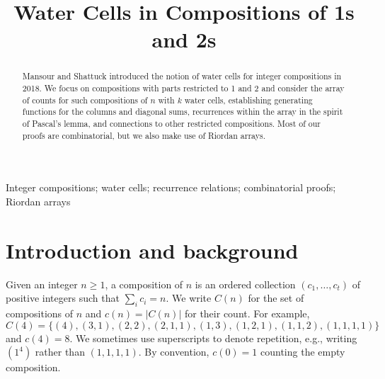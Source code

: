 \documentclass[]{interact}
\makeatletter
\newcommand{\monthyear}[1]{%
  \def\@monthyear{\uppercase{#1}}}
\newcommand{\volnumber}[1]{%
  \def\@volnumber{\uppercase{#1}}}
\theoremstyle{plain}
\numberwithin{equation}{section} %
\numberwithin{table}{section} %
\numberwithin{figure}{section}
\makeatother
\begin{document}
\monthyear{Month Year}
\volnumber{Volume, Number}
\setcounter{page}{1}

\title{Water Cells in Compositions of 1s and 2s}

\author{
}

\maketitle

\begin{abstract}
Mansour and Shattuck introduced the notion of water cells for integer compositions in 2018.  We focus on compositions with parts restricted to 1 and 2 and consider the array of counts for such compositions of $n$ with $k$ water cells, establishing generating functions for the columns and diagonal sums, recurrences within the array in the spirit of Pascal's lemma, and connections to other restricted compositions.  Most of our proofs are combinatorial, but we also make use of Riordan arrays.\end{abstract}

\begin{keywords}
	Integer compositions; water cells; recurrence relations; combinatorial proofs; Riordan arrays
\end{keywords}



\section{Introduction and background}
Given an integer $n \ge 1$, a composition of $n$ is an ordered collection $(c_1, \ldots, c_t)$ of positive integers such that $\sum_i c_i = n$.  We write $C(n)$ for the set of compositions of $n$ and $c(n) = |C(n)|$ for their count.  For example, 
\[ C(4) = \{(4), (3,1), (2,2), (2,1,1), (1,3), (1,2,1), (1,1,2), (1,1,1,1)\}\]
and $c(4) = 8$.  We sometimes use superscripts to denote repetition, e.g., writing $(1^4)$ rather than $(1,1,1,1)$.   
By convention, $c(0) = 1$ counting the empty composition.
\end{document}

